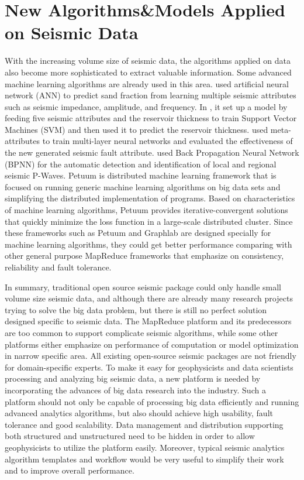 \section{New Algorithms\&Models Applied on Seismic Data}
With the increasing volume size of seismic data, the algorithms applied on data also become more sophisticated to extract valuable information. Some advanced machine learning algorithms are already used in this area. \cite{7067356ChakiPredictSandNeuralNetwork} used artificial neural network (ANN) to predict sand fraction from learning multiple seismic attributes such as seismic impedance, amplitude, and frequency. In \cite{6234749DengSVMPredictReservoir}, it set up a model by feeding five seismic attributes and the reservoir thickness to train Support Vector Machines (SVM) and then used it to predict the reservoir thickness. \cite{4026836MachadoNerualNetworksFault} used meta-attributes to train multi-layer neural networks and evaluated the effectiveness of the new generated seismic fault attribute. \cite{6707117KaurPWaveANN} used Back Propagation Neural Network (BPNN) for the automatic detection and identification of local and regional seismic P-Waves. 
Petuum \cite{Dai2013Petuum} is distributed machine learning framework that is focused on running generic machine learning algorithms on big data sets and simplifying the distributed implementation of programs. Based on characteristics of machine learning algorithms, Petuum provides iterative-convergent solutions that quickly minimize the loss function in a large-scale distributed cluster. Since these frameworks such as Petuum and Graphlab \cite{DatoGraphLab} are designed specially for machine learning algorithms, they could get better performance comparing with other general purpose MapReduce frameworks that emphasize on consistency, reliability and fault tolerance. 

In summary, traditional open source seismic package could only handle small volume size seismic data, and although there are already many research projects trying to solve the big data problem, but there is still no perfect solution designed specific to seismic data. The MapReduce platform and its predecessors are too common to support complicate seismic algorithms, while some other platforms either emphasize on performance of computation or model optimization in narrow specific area. All existing open-source seismic packages are not friendly for domain-specific experts.
To make it easy for geophysicists and data scientists processing and analyzing big seismic data, a new platform is needed by incorporating the advances of big data research into the industry. Such a platform should not only be capable of processing big data efficiently and running advanced analytics algorithms, but also should achieve high usability, fault tolerance and good scalability. Data management and distribution supporting both structured and unstructured need to be hidden in order to allow geophysicists to utilize the platform easily. Moreover, typical seismic analytics algorithm templates and workflow would be very useful to simplify their work and to improve overall performance. 


